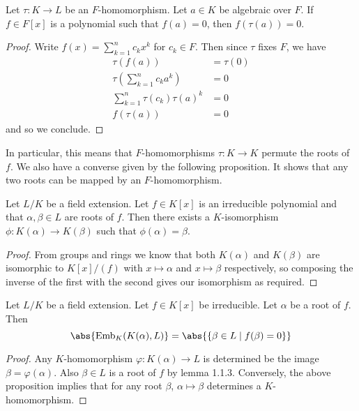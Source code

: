 \documentclass[a4paper]{article}
\begin{document}
\begin{lmm}{}{} Let $\tau:K\to L$ be an $F$-homomorphism. Let $a\in K$ be algebraic over $F$. If $f\in F[x]$ is a polynomial such that $f(a)=0$, then $f(\tau(a))=0$. \tcbline
\begin{proof}
Write $f(x)=\sum_{k=1}^nc_kx^k$ for $c_k\in F$. Then since $\tau$ fixes $F$, we have 
\begin{align*}
\tau(f(a))&=\tau(0)\\
\tau\left(\sum_{k=1}^nc_ka^k\right)&=0\\
\sum_{k=1}^n\tau(c_k)\tau(a)^k&=0\tag{$\tau$ is a field homomorphism}\\
f(\tau(a))&=0
\end{align*}
and so we conclude. 
\end{proof}
\end{lmm}

In particular, this means that $F$-homomorphisms $\tau:K\to K$ permute the roots of $f$. We also have a converse given by the following proposition. It shows that any two roots can be mapped by an $F$-homomorphism. 

\begin{prp}{}{} Let $L/K$ be a field extension. Let $f\in K[x]$ is an irreducible polynomial and that $\alpha,\beta\in L$ are roots of $f$. Then there exists a $K$-isomorphism $\phi:K(\alpha)\to K(\beta)$ such that $\phi(\alpha)=\beta$. \tcbline
\begin{proof}
From groups and rings we know that both $K(\alpha)$ and $K(\beta)$ are isomorphic to $K[x]/(f)$ with $x\mapsto\alpha$ and $x\mapsto\beta$ respectively, so composing the inverse of the first with the second gives our isomorphism as required. 
\end{proof}
\end{prp}

\begin{crl}{}{} Let $L/K$ be a field extension. Let $f\in K[x]$ be irreducible. Let $\alpha$ be a root of $f$. Then $$\abs{\text{Emb}_K(K(\alpha),L)}=\abs{\{\beta\in L\;|\;f(\beta)=0\}}$$ \tcbline
\begin{proof}
Any $K$-homomorphism $\varphi:K(\alpha)\to L$ is determined be the image $\beta=\varphi(\alpha)$. Also $\beta\in L$ is a root of $f$ by lemma 1.1.3. Conversely, the above proposition implies that for any root $\beta$, $\alpha\mapsto\beta$ determines a $K$-homomorphism. 
\end{proof}
\end{crl}
\end{document}
